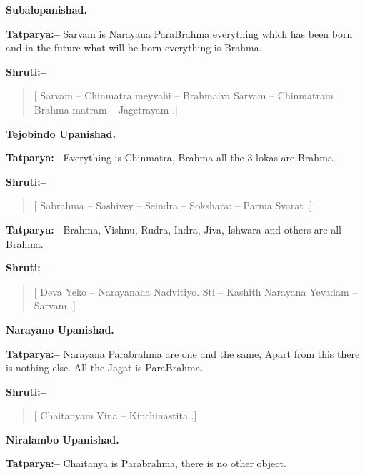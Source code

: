 \begin{flushright}
\textbf{Subalopanishad.}
\end{flushright}

\textbf{Tatparya:–} Sarvam is Narayana ParaBrahma everything which has been born and in the future what will be born everything is Brahma.

\textbf{Shruti:–}

\begin{verse}
[ Sarvam – Chinmatra meyvahi – Brahmaiva Sarvam – Chinmatram  Brahma matram – Jagetrayam .]
\end{verse}

\begin{flushright}
\textbf{Tejobindo Upanishad.}
\end{flushright}

\textbf{Tatparya:–} Everything is Chinmatra, Brahma all the 3 lokas are Brahma.

\textbf{Shruti:–}

\begin{verse}
[ Sabrahma – Sashivey – Seindra – Sokshara: – Parma Svarat .]
\end{verse}

\textbf{Tatparya:–} Brahma, Vishnu, Rudra, Indra, Jiva, Ishwara and others are all Brahma.

\textbf{Shruti:–}

\begin{verse}
[ Deva Yeko – Narayanaha  Nadvitiyo. Sti – Kashith  Narayana Yevadam – Sarvam .]
\end{verse}

\begin{flushright}
\textbf{Narayano Upanishad.}
\end{flushright}

\textbf{Tatparya:–} Narayana Parabrahma are one and the same, Apart from this there is nothing else. All the Jagat is ParaBrahma.

\textbf{Shruti:–}

\begin{verse}
[ Chaitanyam Vina – Kinchinastita .]
\end{verse}

\begin{flushright}
\textbf{Niralambo Upanishad.}
\end{flushright}

\textbf{Tatparya:–} Chaitanya is Parabrahma, there is no other object.

